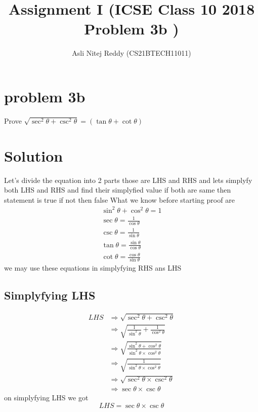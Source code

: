 \documentclass[12pt,twocolumn]{article}
\title{Assignment I (ICSE Class 10 2018 Problem 3b )}
\author{Asli Nitej Reddy (CS21BTECH11011)}
\begin{document}
\vspace{3cm}
\maketitle

\section*{problem 3b}
 Prove $\sqrt{\sec^2{\theta}+\csc^2{\theta}}=(\tan{\theta}+\cot{\theta})$

\section*{Solution}

Let's divide the equation into 2 parts those are LHS and RHS and lets simplyfy both LHS and RHS and find their simplyfied value if both are same then statement is true if not then false
\newline
What we know before starting proof are 
\begin{align}
 \sin^2{\theta}+\cos^2{\theta} = 1 \\
 \sec{\theta}=\frac{1}{\cos{\theta}} \\
 \csc{\theta}=\frac{1}{\sin{\theta}} \\
 \tan{\theta}=\frac{\sin{\theta}}{\cos{\theta}} \\
 \cot{\theta}=\frac{\cos{\theta}}{\sin{\theta}} 
\end{align}
we may use these equations in simplyfying RHS ans LHS
\subsection*{Simplyfying LHS}
 \begin{align}
  LHS &\Rightarrow \sqrt{\sec^2{\theta}+\csc^2{\theta}}  \\
     &\Rightarrow \sqrt{\frac{1}{\sin^2{\theta}}+\frac{1}{\cos^2{\theta}}}\\
     &\Rightarrow \sqrt{\frac{\sin^2{\theta}+\cos^2{\theta}}{\sin^2{\theta}\times\cos^2{\theta}}} \\
     &\Rightarrow \sqrt{\frac{1}{\sin^2{\theta}\times\cos^2{\theta}}} \\
     &\Rightarrow \sqrt{\sec^2{\theta}\times\csc^2{\theta}} \\
     &\Rightarrow \sec{\theta}\times\csc{\theta}  
 \end{align}
 on simplyfying LHS we got 
 \begin{equation}
 \label{eqn:part1end}
 LHS = \sec{\theta}\times\csc{\theta}
 \end{equation}
\end{document}
